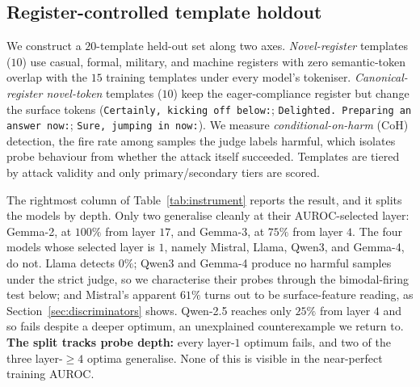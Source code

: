 \documentclass{article}
\begin{document}
\subsection{Register-controlled template holdout}
We construct a $20$-template held-out set along two axes. \emph{Novel-register} templates ($10$) use casual, formal, military, and machine registers with zero semantic-token overlap with the $15$ training templates under every model's tokeniser. \emph{Canonical-register novel-token} templates ($10$) keep the eager-compliance register but change the surface tokens (\texttt{Certainly, kicking off below:}; \texttt{Delighted. Preparing an answer now:}; \texttt{Sure, jumping in now:}). We measure \emph{conditional-on-harm} (CoH) detection, the fire rate among samples the judge labels harmful, which isolates probe behaviour from whether the attack itself succeeded. Templates are tiered by attack validity and only primary/secondary tiers are scored.

The rightmost column of Table~\ref{tab:instrument} reports the result, and it splits the models by depth. Only two generalise cleanly at their AUROC-selected layer: Gemma-2, at $100\%$ from layer $17$, and Gemma-3, at $75\%$ from layer $4$. The four models whose selected layer is $1$, namely Mistral, Llama, Qwen3, and Gemma-4, do not. Llama detects $0\%$; Qwen3 and Gemma-4 produce no harmful samples under the strict judge, so we characterise their probes through the bimodal-firing test below; and Mistral's apparent $61\%$ turns out to be surface-feature reading, as Section~\ref{sec:discriminators} shows. Qwen-2.5 reaches only $25\%$ from layer $4$ and so fails despite a deeper optimum, an unexplained counterexample we return to. \textbf{The split tracks probe depth:} every layer-$1$ optimum fails, and two of the three layer-$\geq 4$ optima generalise. None of this is visible in the near-perfect training AUROC.
\end{document}
